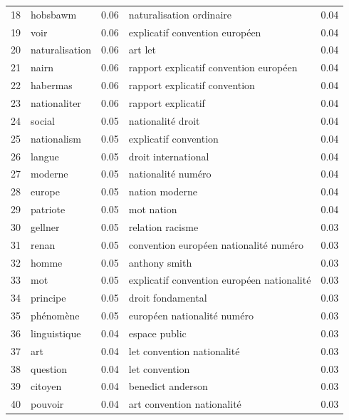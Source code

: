 \documentclass[11pt]{article}
\begin{document}
\begin{table}[H]
\begin{center}
\begin{small}
\begin{tabular*}{\textwidth}{|l|| @{\extracolsep{\fill}} l c || l c |}
18  &  hobsbawm   &  0.06  &          naturalisation ordinaire  &  0.04  \\
19  &      voir   &  0.06  &          explicatif convention européen  &  0.04  \\
20  &       naturalisation   &  0.06  &     art let  &  0.04  \\
21  &     nairn   &  0.06  &        rapport explicatif convention européen  &  0.04  \\
22  &      habermas   &  0.06  &    rapport explicatif convention  &  0.04  \\
23  &       nationaliter   &  0.06  & rapport explicatif  &  0.04  \\
24  &       social   &  0.05  &         nationalité droit  &  0.04  \\
25  &         nationalism   &  0.05  &      explicatif convention  &  0.04  \\
26  &     langue  &  0.05  &     droit international  &  0.04  \\
27  &        moderne   &  0.05  &       nationalité numéro  &  0.04  \\
28  &       europe   &  0.05  &        nation moderne &  0.04  \\
29  &        patriote   &  0.05  &          mot nation  &  0.04  \\
30  &    gellner   &  0.05  &         relation racisme  &  0.03  \\
31  &        renan   &  0.05  &   convention européen nationalité numéro  &  0.03  \\
32  &    homme   &  0.05  &  anthony smith  &  0.03  \\
33  &          mot   &  0.05  &  explicatif convention européen nationalité  &  0.03  \\
34  &     principe   &  0.05  &  droit fondamental &  0.03  \\
35  &         phénomène   &  0.05  &      européen nationalité numéro  &  0.03  \\
36  &     linguistique   &  0.04  &            espace public  &  0.03  \\
37  &         art   &  0.04  &          let convention nationalité  &  0.03  \\
38  &        question   &  0.04  &          let convention  &  0.03  \\
39  &       citoyen   &  0.04  &           benedict anderson  &  0.03  \\
40  &     pouvoir   &  0.04  &           art convention nationalité  &  0.03  \\

\end{tabular*}
\end{small}
\end{center}
\end{table}
\end{document}
